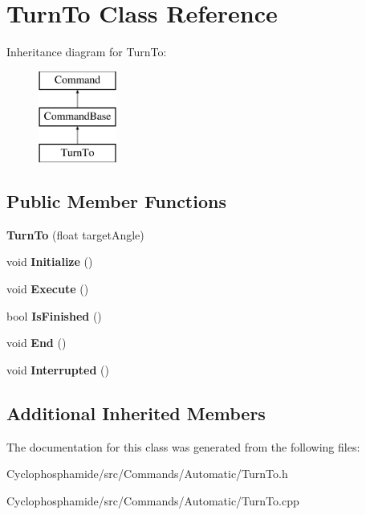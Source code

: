 \hypertarget{class_turn_to}{}\section{Turn\+To Class Reference}
\label{class_turn_to}
Inheritance diagram for Turn\+To\+:\begin{figure}[H]
\begin{center}
\leavevmode
\includegraphics[height=3.000000cm]{class_turn_to}
\end{center}
\end{figure}
\subsection*{Public Member Functions}
\begin{DoxyCompactItemize}
\item 
\hypertarget{class_turn_to_aa74a4bd0785dce24fdda1e1bf79cd39b}{}{\bfseries Turn\+To} (float target\+Angle)\label{class_turn_to_aa74a4bd0785dce24fdda1e1bf79cd39b}

\item 
\hypertarget{class_turn_to_a1573bc8d8345d2dbe40866937d4e41a1}{}void {\bfseries Initialize} ()\label{class_turn_to_a1573bc8d8345d2dbe40866937d4e41a1}

\item 
\hypertarget{class_turn_to_ae60afcdabfc0510abf2718f89919e8df}{}void {\bfseries Execute} ()\label{class_turn_to_ae60afcdabfc0510abf2718f89919e8df}

\item 
\hypertarget{class_turn_to_a645fa93286ea2657ec45166ec9a10662}{}bool {\bfseries Is\+Finished} ()\label{class_turn_to_a645fa93286ea2657ec45166ec9a10662}

\item 
\hypertarget{class_turn_to_a22e332211c9979bc29d408299f5d6188}{}void {\bfseries End} ()\label{class_turn_to_a22e332211c9979bc29d408299f5d6188}

\item 
\hypertarget{class_turn_to_a89e338cc7fd550fb0f2e6fb75698ae05}{}void {\bfseries Interrupted} ()\label{class_turn_to_a89e338cc7fd550fb0f2e6fb75698ae05}

\end{DoxyCompactItemize}
\subsection*{Additional Inherited Members}


The documentation for this class was generated from the following files\+:\begin{DoxyCompactItemize}
\item 
Cyclophosphamide/src/\+Commands/\+Automatic/Turn\+To.\+h\item 
Cyclophosphamide/src/\+Commands/\+Automatic/Turn\+To.\+cpp\end{DoxyCompactItemize}
